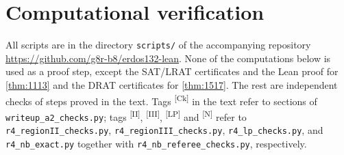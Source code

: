\documentclass[11pt]{amsart}
\theoremstyle{definition}
\theoremstyle{remark}
\newcommand{\chk}[1]{\textsuperscript{[#1]}}
\begin{document}
\appendix
\section{Computational verification}\label{app:verification}

All scripts are in the directory \texttt{scripts/} of the accompanying repository \url{https://github.com/g8r-b8/erdos132-lean}. None of the computations below is used as a proof step, except the SAT/LRAT certificates and the Lean proof for \cref{thm:1113} and the DRAT certificates for \cref{thm:1517}. The rest are independent checks of steps proved in the text. Tags \chk{Ck} in the text refer to sections of \texttt{writeup\_a2\_checks.py}; tags \chk{II}, \chk{III}, \chk{LP} and \chk{N} refer to \texttt{r4\_regionII\_checks.py}, \texttt{r4\_regionIII\_checks.py}, \texttt{r4\_lp\_checks.py}, and \texttt{r4\_nb\_exact.py} together with \texttt{r4\_nb\_referee\_checks.py}, respectively.
\end{document}
